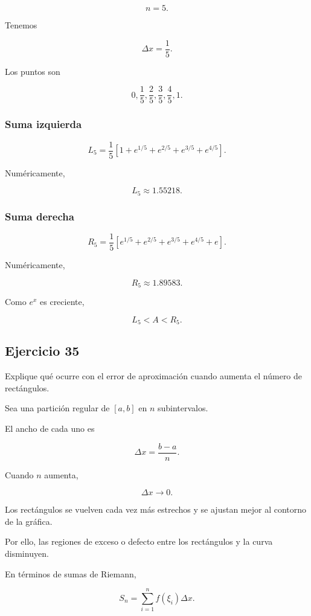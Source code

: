\documentclass[12pt]{article}
\begin{document}
\[
n=5.
\]

Tenemos

\[
\Delta x=
\frac{1}{5}.
\]

Los puntos son

\[
0,\frac15,\frac25,\frac35,\frac45,1.
\]

\subsubsection*{Suma izquierda}

\[
L_5
=
\frac15
\left[
1
+e^{1/5}
+e^{2/5}
+e^{3/5}
+e^{4/5}
\right].
\]

Numéricamente,

\[
\boxed{
L_5\approx1.55218
}.
\]

\subsubsection*{Suma derecha}

\[
R_5
=
\frac15
\left[
e^{1/5}
+e^{2/5}
+e^{3/5}
+e^{4/5}
+e
\right].
\]

Numéricamente,

\[
\boxed{
R_5\approx1.89583
}.
\]

Como \(e^x\) es creciente,

\[
\boxed{
L_5<A<R_5
}.
\]

\subsection*{Ejercicio 35}

Explique qué ocurre con el error de aproximación cuando aumenta el
número de rectángulos.

Sea una partición regular de \([a,b]\) en \(n\) subintervalos.

El ancho de cada uno es

\[
\Delta x=
\frac{b-a}{n}.
\]

Cuando \(n\) aumenta,

\[
\Delta x\longrightarrow0.
\]

Los rectángulos se vuelven cada vez más estrechos y se ajustan mejor al
contorno de la gráfica.

Por ello, las regiones de exceso o defecto entre los rectángulos y la
curva disminuyen.

En términos de sumas de Riemann,

\[
S_n=
\sum_{i=1}^{n}
f(\xi_i)\Delta x.
\]
\end{document}
